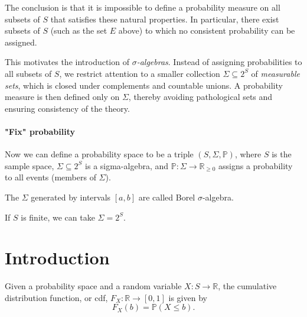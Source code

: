 The conclusion is that it is impossible to define a probability measure on all subsets of $S$ that satisfies these natural properties. In particular, there exist subsets of $S$ (such as the set $E$ above) to which no consistent probability can be assigned.

This motivates the introduction of \emph{$\sigma$-algebras}. Instead of assigning probabilities to all subsets of $S$, we restrict attention to a smaller collection $\Sigma \subseteq 2^S$ of \emph{measurable sets}, which is closed under complements and countable unions. A probability measure is then defined only on $\Sigma$, thereby avoiding pathological sets and ensuring consistency of the theory.

\paragraph{"Fix" probability}

Now we can define a probability space to be a triple \((S, \Sigma , \mathbb{P})\), where \(S\) is the sample space, \(\Sigma \subseteq 2^S\) is a sigma-algebra, and \(\mathbb{P} : \Sigma \to \mathbb{R} _{\ge 0}\) assigns a probability to all events (members of \(\Sigma\)).   

\begin{definition}
    The \(\Sigma\) generated by intervals \([a, b]\) are called Borel \(\sigma \)-algebra.    
\end{definition}

\begin{remark}
    If \(S\) is finite, we can take \(\Sigma = 2^S\).  
\end{remark}

\section{Introduction}
\begin{definition}
    Given a probability space and a random variable \(X: S \to \mathbb{R}\), the cumulative distribution function, or cdf, \(F_X: \mathbb{R} \to [0, 1]\) is given by 
    \[
        F_X(b) = \mathbb{P} (X \le b).
    \]  
\end{definition}

